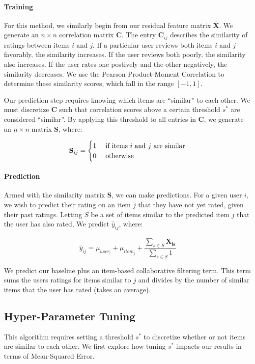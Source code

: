 \documentclass[12pt]{article}
\begin{document}
\paragraph{Training} For this method, we similarly begin from our residual feature matrix $\mathbf{\bar X}$. We generate an $n \times n$ correlation matrix $\mathbf{C}$. The entry $\mathbf{C}_{ij}$ describes the similarity of ratings between items $i$ and $j$. If a particular user reviews both items $i$ and $j$ favorably, the similarity increases. If the user reviews both poorly, the similarity also increases. If the user rates one postively and the other negatively, the similarity decreases. We use the Pearson Product-Moment Correlation to determine these similarity scores, which fall in the range $[-1, 1]$.

Our prediction step requires knowing which items are ``similar'' to each other. We must discretize $\mathbf{C}$ such that correlation scores above a certain threshold $s^*$ are considered ``similar''. By applying this threshold to all entries in $\mathbf{C}$, we generate an $n \times n$ matrix $\mathbf{S}$, where:

$$
\mathbf{S}_{ij} =
\begin{cases}
    \hfill 1    \hfill & \text{ if items $i$ and $j$ are similar} \\
    \hfill 0    \hfill & \text{ otherwise} \\
\end{cases}
$$

\paragraph{Prediction} Armed with the similarity matrix $\mathbf{S}$, we can make predictions. For a given user $i$, we wish to predict their rating on an item $j$ that they have not yet rated, given their past ratings. Letting $S$ be a set of items similar to the predicted item $j$ that the user has also rated, We predict $\hat y_{ij}$, where:

$$ \hat y_{ij} = \mu_{user_i} + \mu_{item_j} + \frac{\sum_{s \in S} \mathbf{\bar X_{is}}}{\sum_{s \in S} 1 }$$

We predict our baseline plus an item-based collaborative filtering term. This term sums the users ratings for items similar to $j$ and divides by the number of similar items that the user has rated (takes an average).

\subsection{Hyper-Parameter Tuning}
This algorithm requires setting a threshold $s^*$ to discretize whether or not items are similar to each other. We first explore how tuning $s^*$ impacts our results in terms of Mean-Squared Error.
\end{document}
